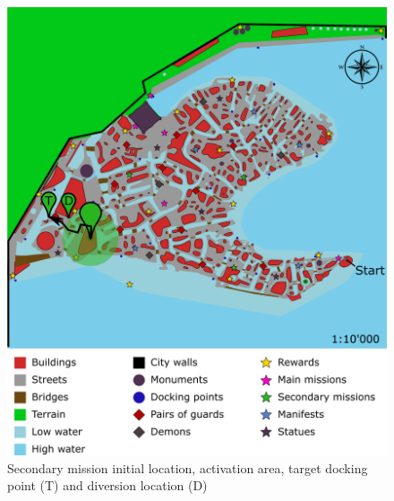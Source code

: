 \begin{figure}[H]
  \centering
  \includegraphics[width=\textwidth]{../Images/Maps/dynamiaSecondaryMissions_Councilman}
  \caption{Secondary mission initial location, activation area, target docking point (T) and diversion location (D)}
\end{figure}

